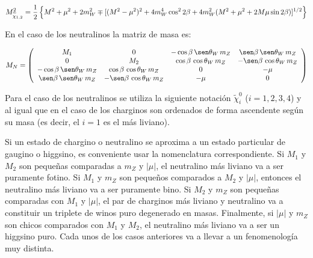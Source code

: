 \begin{itemize}
\begin{equation}
  M^2_{\widetilde{\chi}_{1,2}} = \frac{1}{2} \left\{ M^2 + \mu^2 + 2 m_W^2 \mp
  [(M^2-\mu^2)^2 + 4 m_W^4 \cos^2 2\beta + 4 m_W^2 (M^2+\mu^2 + 2 M \mu \sin
    2\beta)]^{1/2} \right\}
\end{equation}



En el caso de los neutralinos la matriz de masa es:

\begin{equation}
  M_{N} = \left(
  \begin{array}{cccc}
    M_1 & 0 & - \cos\beta \, \sen\theta_W \, m_Z & \sen\beta \, \sen\theta_W \, m_Z \\
    0 & M_2 & \cos\beta \, \cos\theta_W \, m_Z & -\sen\beta \, \cos\theta_W \, m_Z \\
    - \cos\beta \, \sen\theta_W \, m_Z & \cos\beta \, \cos\theta_W  \,m_Z & 0 & -\mu \\
    \sen\beta \, \sen\theta_W \, m_Z & -\sen\beta \, \cos\theta_W \, m_Z & -\mu & 0 \\
  \end{array}
  \right)
\end{equation}

Para el caso de los neutralinos se utiliza la siguiente notación $\tilde{\chi}^0_{i}$ ($i=1,2,3,4$)
y al igual que en el caso de los charginos son ordenados de forma ascendente según su masa (es decir,
el $i=1$ es el más liviano).




Si un estado de chargino o neutralino se aproxima a un estado particular de
gaugino o higgsino, es conveniente usar la nomenclatura correspondiente. Si
$M_1$ y $M_2$ son pequeñas comparadas a $m_Z$ y $|\mu|$, el neutralino más
liviano va a ser puramente fotino. Si $M_1$ y $m_Z$ son pequeños comparados a
$M_2$ y $|\mu|$, entonces el neutralino más liviano va a ser puramente bino. Si
$M_2$ y $m_Z$ son pequeñas comparadas con $M_1$ y $|\mu|$, el par de charginos
más liviano y neutralino va a constituir un triplete de winos puro degenerado en
masas. Finalmente, si $|\mu|$ y $m_Z$ son chicos comparados con $M_1$ y $M_2$,
el neutralino más liviano va a ser un higgsino puro. Cada unos de los casos
anteriores va a llevar a un fenomenología muy distinta.



\end{itemize}
